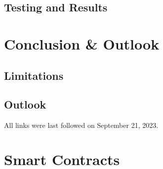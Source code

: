 \documentclass[
  a4paper,  %
  twoside,  %
  bibliography=totoc,
  headsepline,
  cleardoublepage=empty,
  parskip=half,
  draft=false
]{scrbook}
\begin{document}
\section{Testing and Results}


\chapter{Conclusion \& Outlook}

\section{Limitations}

\section{Outlook}


\printbibliography

All links were last followed on September 21, 2023.

\appendix
\chapter{Smart Contracts}



\pagestyle{empty}
\renewcommand*{\chapterpagestyle}{empty}
\Versicherung
\end{document}

